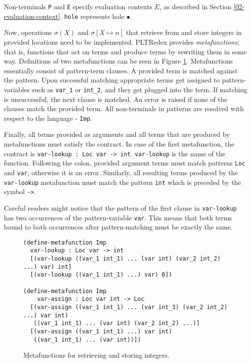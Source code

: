 Non-terminals \texttt{P} and \texttt{E} specify evaluation contexts $E$, as described in Section \ref{02-evaluation-context}. \texttt{hole} represents hole $\bullet$.


Now, operations $\sigma(X)$ and $\sigma[X \mapsto n]$ that retrieve from and store integers in provided locations need to be implemented. PLTRedex provides \textit{metafunctions}; that is, functions that act on terms and produce terms by rewriting them in some way. Definitions of two metafunctions can be seen in Figure \ref{imp-define-mf}. Metafunctions essentially consist of pattern-term clauses. A provided term is matched against the pattern. Upon successful matching appropriate terms get assigned to pattern-variables such as \texttt{var\_1} or \texttt{int\_2}, and they get plugged into the term. If matching is unsuccessful, the next clause is matched. An error is raised if none of the clauses match the provided term. All non-terminals in patterns are resolved with respect to the language - \texttt{Imp}.

Finally, all terms provided as arguments and all terms that are produced by metafunctions must satisfy the contract. In case of the first metafunction, the contract is \texttt{var-lookup : Loc var -> int}. \texttt{var-lookup} is the name of the function. Following the colon, provided argument terms must match patterns \texttt{Loc} and \texttt{var}, otherwise it is an error. Similarly, all resulting terms produced by the \texttt{var-lookup} metafunction must match the pattern \texttt{int} which is preceded by the symbol \texttt{->}.

Careful readers might notice that the pattern of the first clause in \texttt{var-lookup} has two occurrences of the pattern-variable \texttt{var}. This means that both terms bound to both occurrences after pattern-matching must be exactly the same.

\begin{figure}[htb]
\begin{verbatim}
(define-metafunction Imp
  var-lookup : Loc var -> int
  [(var-lookup ((var_1 int_1) ... (var int) (var_2 int_2) ...) var) int]
  [(var-lookup ((var_1 int_1) ...) var) 0])

(define-metafunction Imp
    var-assign : Loc var int -> Loc 
  [(var-assign ((var_1 int_1) ... (var int_3) (var_2 int_2) ...) var int)
   ((var_1 int_1) ... (var int) (var_2 int_2) ...)]
  [(var-assign ((var_1 int_1) ...) var int)
   ((var_1 int_1) ... (var int))])
\end{verbatim}
\caption{Metafunctions for retrieving and storing integers.}
\label{imp-define-mf}
\end{figure}

